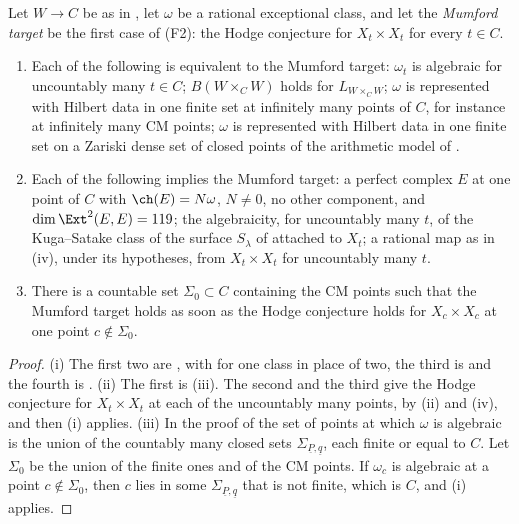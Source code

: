 \begin{corollary}\label{cor:mumfordone}
Let $W\to C$ be as in , let $\omega$ be a rational
exceptional class, and let the \emph{Mumford target} be the first case of
\textup{(F2)}: the Hodge conjecture for $X_{t}\times X_{t}$ for every $t\in C$.
\begin{enumerate}[label=\textup{(\roman*)},leftmargin=2.6em,itemsep=2pt]
\item Each of the following is equivalent to the Mumford target: $\omega_{t}$ is
  algebraic for uncountably many $t\in C$; $B(W\times_{C}W)$ holds for
  $L_{W\times_{C}W}$; $\omega$ is represented with Hilbert data in one finite
  set at infinitely many points of $C$, for instance at infinitely many CM
  points; $\omega$ is represented with Hilbert data in one finite set on a
  Zariski dense set of closed points of the arithmetic model of
  .
\item Each of the following implies the Mumford target: a perfect complex $E$
  at one point of $C$ with $\ch(E)=N\omega$, $N\ne0$, no other component, and
  $\dim\Ext^{2}(E,E)=119$; the algebraicity, for uncountably many $t$, of the
  Kuga--Satake class of the surface $S_{\lambda}$ of 
  attached to $X_{t}$; a rational map as in (iv), under
  its hypotheses, from $X_{t}\times X_{t}$ for uncountably many $t$.
\item There is a countable set $\Sigma_{0}\subset C$ containing the CM points
  such that the Mumford target holds as soon as the Hodge conjecture holds for
  $X_{c}\times X_{c}$ at one point $c\notin\Sigma_{0}$.
\end{enumerate}
\end{corollary}

\begin{proof}
(i) The first two are , with 
for one class in place of two, the third is  and the
fourth is . (ii) The first is
(iii). The second and the third give the Hodge
conjecture for $X_{t}\times X_{t}$ at each of the uncountably many points, by
(ii) and (iv), and then (i) applies.
(iii) In the proof of  the set of points at which
$\omega$ is algebraic is the union of the countably many closed sets
$\Sigma_{\underline{P},\underline{q}}$, each finite or equal to $C$. Let
$\Sigma_{0}$ be the union of the finite ones and of the CM points. If
$\omega_{c}$ is algebraic at a point $c\notin\Sigma_{0}$, then $c$ lies in
some $\Sigma_{\underline{P},\underline{q}}$ that is not finite, which is $C$,
and (i) applies.
\end{proof}

